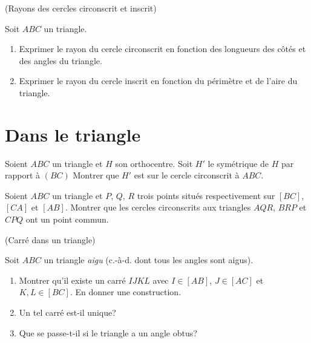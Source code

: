 \documentclass[a4paper,11pt,reqno]{amsart}
\begin{document}
\begin{exo} (Rayons des cercles circonscrit et inscrit)

  Soit $ABC$ un triangle.
  \begin{enumerate}
    \item Exprimer le rayon du cercle circonscrit en fonction des longueurs des côtés et des angles du triangle.
    \item Exprimer le rayon du cercle inscrit en fonction du périmètre et de l'aire du triangle.
  \end{enumerate}
\end{exo}


\section{Dans le triangle}

\begin{exo}

  Soient $ABC$ un triangle et $H$  son orthocentre. Soit $H'$ le symétrique de $H$ par rapport à $(BC)$ Montrer que $H'$ est sur le cercle circonscrit à $ABC$.
\end{exo}

\begin{exo}

  Soient $ABC$ un triangle et $P$, $Q$, $R$ trois points situés respectivement sur $[BC]$, $[CA]$ et $[AB]$. Montrer que les cercles circonscrits aux triangles $AQR$, $BRP$ et $CPQ$ ont un point commun.
\end{exo}


\begin{exo} (Carré dans un  triangle)

  Soit $ABC$ un triangle \emph{aigu} (c.-à-d. dont tous les angles sont aigus).
  \begin{enumerate}
    \item Montrer qu'il existe un carré $IJKL$ avec $I \in [AB]$, $J \in [AC]$ et $K,L \in [BC]$. En donner une construction.
    \item Un tel carré est-il unique?
    \item Que se passe-t-il si le triangle a un angle obtus?
  \end{enumerate}
\end{exo}
\end{document}
